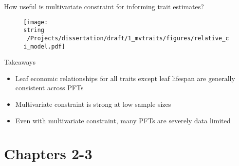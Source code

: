 \documentclass{beamer}
\begin{document}
\begin{frame}{How useful is multivariate constraint for informing trait estimates?}
  \begin{figure}
    \texttt{[image: \\string ~/Projects/dissertation/draft/1\_mvtraits/figures/relative\_ci\_model.pdf]}
  \end{figure}
\end{frame}

\begin{frame}{Takeaways}
  \begin{itemize}
  \item<2-> Leaf economic relationships for all traits except leaf lifespan are
    generally consistent across PFTs
    \item<3-> Multivariate constraint is strong at low sample sizes
    \item<4-> Even with multivariate constraint, many PFTs are severely data limited
  \end{itemize}
\end{frame}

\section{Chapters 2-3}

\end{document}
